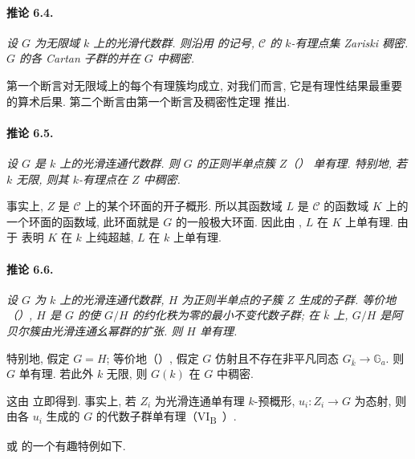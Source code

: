 \paragraph{\textbf{推论 6.4.}}
{\itshape 设 \(G\) 为无限域 \(k\) 上的光滑代数群. 则沿用  的记号, \(\mathcal C\) 的 \(k\)-有理点集 Zariski 稠密. \(G\) 的各 Cartan 子群的并在 \(G\) 中稠密.}

第一个断言对无限域上的每个有理簇均成立, 对我们而言, 它是有理性结果最重要的算术后果. 第二个断言由第一个断言及稠密性定理  推出.

\paragraph{\textbf{推论 6.5.}}
{\itshape 设 \(G\) 是 \(k\) 上的光滑连通代数群. 则 \(G\) 的正则半单点簇 \(Z\)\textup{（）} 单有理. 特别地, 若 \(k\) 无限, 则其 \(k\)-有理点在 \(Z\) 中稠密.}

事实上, \(Z\) 是 \(\mathcal C\) 上的某个环面的开子概形. 所以其函数域 \(L\) 是 \(\mathcal C\) 的函数域 \(K\) 上的一个环面的函数域, 此环面就是 \(G\) 的一般极大环面. 因此由 , \(L\) 在 \(K\) 上单有理. 由于  表明 \(K\) 在 \(k\) 上纯超越, \(L\) 在 \(k\) 上单有理.

\paragraph{\textbf{推论 6.6.}}
{\itshape 设 \(G\) 为 \(k\) 上的光滑连通代数群, \(H\) 为正则半单点的子簇 \(Z\) 生成的子群. 等价地\textup{（）}, \(H\) 是 \(G\) 的使 \(G/H\) 的约化秩为零的最小不变代数子群; 在 \(\bar k\) 上, \(G/H\) 是阿贝尔簇由光滑连通幺幂群的扩张. 则 \(H\) 单有理.

特别地, 假定 \(G=H\); 等价地\textup{（）}, 假定 \(G\) 仿射且不存在非平凡同态 \(G_{\bar k}\to\mathbb G_a\). 则 \(G\) 单有理. 若此外 \(k\) 无限, 则 \(G(k)\) 在 \(G\) 中稠密.}

这由  立即得到. 事实上, 若 \(Z_i\) 为光滑连通单有理 \(k\)-预概形, \(u_i\colon Z_i\to G\) 为态射, 则由各 \(u_i\) 生成的 \(G\) 的代数子群单有理\textup{（VI\textsubscript{B}~）}.

 或  的一个有趣特例如下.


